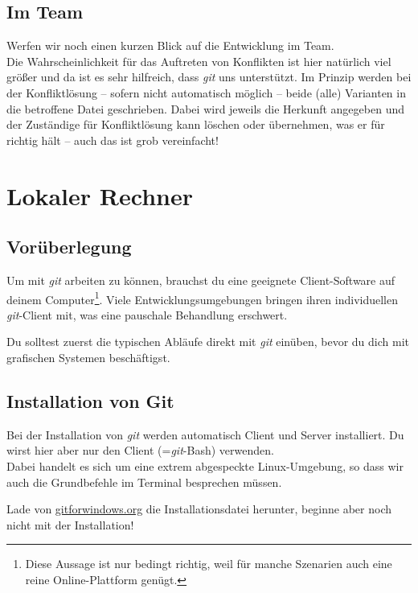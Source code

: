 \documentclass[
  letterpaper,
  DIV=11]{scrreprt}
\newcommand{\git}{\textit{git}\xspace}
\begin{document}
\section{Im Team}\label{im-team}

Werfen wir noch einen kurzen Blick auf die Entwicklung im Team.\\
Die Wahrscheinlichkeit für das Auftreten von Konflikten ist hier
natürlich viel größer und da ist es sehr hilfreich, dass \git uns
unterstützt. Im Prinzip werden bei der Konfliktlösung -- sofern nicht
automatisch möglich -- beide (alle) Varianten in die betroffene Datei
geschrieben. Dabei wird jeweils die Herkunft angegeben und der
Zuständige für Konfliktlösung kann löschen oder übernehmen, was er für
richtig hält -- auch das ist grob vereinfacht!


\chapter{Lokaler Rechner}\label{lokaler-rechner}

\section{Vorüberlegung}\label{voruxfcberlegung}

Um mit \git arbeiten zu können, brauchst du eine geeignete
Client-Software auf deinem Computer\footnote{Diese Aussage ist nur
  bedingt richtig, weil für manche Szenarien auch eine reine
  Online-Plattform genügt.}. Viele Entwicklungsumgebungen bringen ihren
individuellen \git-Client mit, was eine pauschale Behandlung erschwert.

Du solltest zuerst die typischen Abläufe direkt mit \git einüben, bevor
du dich mit grafischen Systemen beschäftigst.

\section{Installation von Git}\label{installation-von-git}

Bei der Installation von \git werden automatisch Client und Server
installiert. Du wirst hier aber nur den Client (=\git-Bash) verwenden.\\
Dabei handelt es sich um eine extrem abgespeckte Linux-Umgebung, so dass
wir auch die Grundbefehle im Terminal besprechen müssen.

Lade von \href{https://gitforwindows.org}{gitforwindows.org} die
Installationsdatei herunter, beginne aber noch nicht mit der
Installation!
\end{document}
